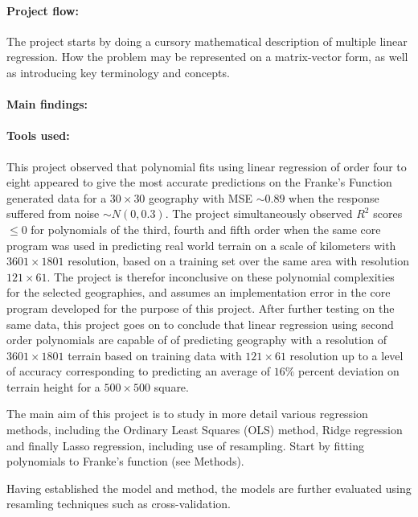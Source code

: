 \documentclass[%
oneside,                 %
final,                   %
10pt]{article}
\begin{document}
\paragraph{Project flow:}
The project starts by doing a cursory mathematical description of multiple linear regression. How the problem may be represented on a matrix-vector form, as well as introducing key terminology and concepts.
\paragraph{Main findings:}
\paragraph{Tools used:} 

This project observed that polynomial fits using linear regression of order four to eight appeared to give the most accurate predictions on the Franke's Function generated data for a $30 \times 30$ geography with MSE $\sim 0.89$ when the response suffered from noise $\sim N(0,0.3)$. The project simultaneously observed $R^2$ scores$\leq 0$ for polynomials of the third, fourth and fifth order when the same core program was used in predicting real world terrain on a scale of kilometers with $3601 \times 1801$ resolution, based on a training set over the same area with resolution $121 \times 61$. The project is therefor inconclusive on these polynomial complexities for the selected geographies, and assumes an implementation error in the core program developed for the purpose of this project. After further testing on the same data, this project goes on to conclude that linear regression using second order polynomials are capable of of predicting geography with a resolution of  $3601 \times 1801$ terrain based on training data with $121 \times 61$ resolution up to a level of accuracy corresponding to predicting an average of $16\%$ percent deviation on terrain height for a $500 \times 500$ square.



The main aim of this project is to study in more detail various regression methods,
including the Ordinary Least Squares (OLS) method, Ridge regression and finally
Lasso regression, including use of resampling. Start by fitting polynomials to Franke's function (see Methods). 




Having established the model and method, the models are further evaluated using resamling
techniques such as cross-validation.
\end{document}
